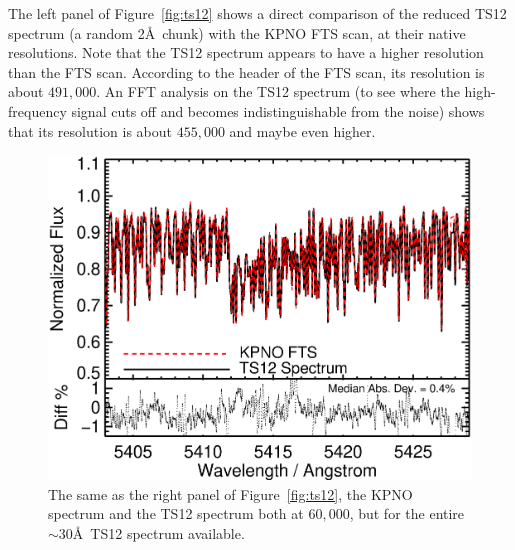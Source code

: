 The left panel of Figure~\ref{fig:ts12} shows a direct comparison of the reduced
TS12 spectrum (a random 2\AA\ chunk) with the KPNO FTS scan, at their
native resolutions. Note that the TS12 spectrum appears to have a
higher resolution than the FTS scan. According to the header of the
FTS scan, its resolution is about $491,000$. An FFT analysis on the TS12
spectrum (to see where the high-frequency signal cuts off and becomes
indistinguishable from the noise) shows that its resolution is about
$455,000$ and maybe even higher.


\begin{figure}[!th]
\includegraphics[angle=0.,scale=0.38]{het/all_60k_gaus_sclrem_diff.eps}
\caption{The same as the right panel of Figure~\ref{fig:ts12}, the
  KPNO spectrum and the TS12 spectrum both at $60,000$, but for the entire
  $\sim$30\AA\ TS12 spectrum available. 
  \label{fig:60k_all}}
\end{figure}


